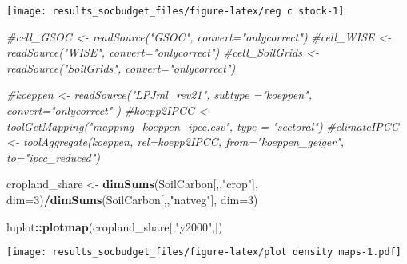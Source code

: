 \documentclass[
]{article}
\newenvironment{Shaded}{\begin{snugshade}}{\end{snugshade}}
\newcommand{\CommentTok}[1]{\textcolor[rgb]{0.56,0.35,0.01}{\textit{#1}}}
\newcommand{\DataTypeTok}[1]{\textcolor[rgb]{0.13,0.29,0.53}{#1}}
\newcommand{\DecValTok}[1]{\textcolor[rgb]{0.00,0.00,0.81}{#1}}
\newcommand{\KeywordTok}[1]{\textcolor[rgb]{0.13,0.29,0.53}{\textbf{#1}}}
\newcommand{\NormalTok}[1]{#1}
\newcommand{\OperatorTok}[1]{\textcolor[rgb]{0.81,0.36,0.00}{\textbf{#1}}}
\newcommand{\StringTok}[1]{\textcolor[rgb]{0.31,0.60,0.02}{#1}}
\begin{document}
\texttt{[image: results\_socbudget\_files/figure-latex/reg c stock-1]}

\begin{Shaded}
\begin{Highlighting}[]
    \CommentTok{\#cell\_GSOC      <{-} readSource("GSOC",  convert="onlycorrect")}
    \CommentTok{\#cell\_WISE      <{-} readSource("WISE",  convert="onlycorrect")}
    \CommentTok{\#cell\_SoilGrids <{-} readSource("SoilGrids",  convert="onlycorrect")}
    
    \CommentTok{\#koeppen     <{-} readSource("LPJml\_rev21", subtype ="koeppen", convert="onlycorrect" )}
    \CommentTok{\#koepp2IPCC  <{-} toolGetMapping("mapping\_koeppen\_ipcc.csv", type = "sectoral")}
    \CommentTok{\#climateIPCC <{-} toolAggregate(koeppen, rel=koepp2IPCC, from="koeppen\_geiger", to="ipcc\_reduced")}
\end{Highlighting}
\end{Shaded}

\begin{Shaded}
\begin{Highlighting}[]
\NormalTok{cropland\_share <{-}}\StringTok{ }\KeywordTok{dimSums}\NormalTok{(SoilCarbon[,,}\StringTok{"crop"}\NormalTok{], }\DataTypeTok{dim=}\DecValTok{3}\NormalTok{)}\OperatorTok{/}\KeywordTok{dimSums}\NormalTok{(SoilCarbon[,,}\StringTok{"natveg"}\NormalTok{], }\DataTypeTok{dim=}\DecValTok{3}\NormalTok{)}

\NormalTok{luplot}\OperatorTok{::}\KeywordTok{plotmap}\NormalTok{(cropland\_share[,}\StringTok{"y2000"}\NormalTok{,])}
\end{Highlighting}
\end{Shaded}

\texttt{[image: results\_socbudget\_files/figure-latex/plot density maps-1.pdf]}
\end{document}
